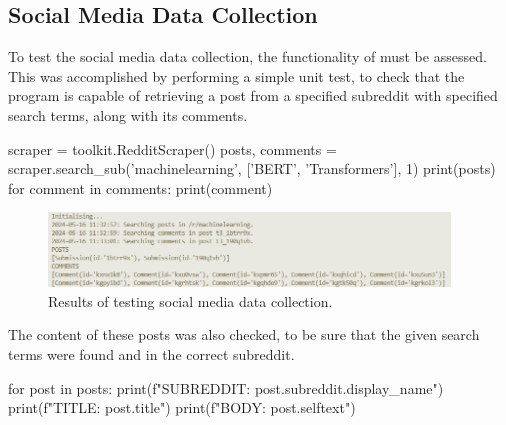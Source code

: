     \subsection{Social Media Data Collection}
    To test the social media data collection, the functionality of  must be assessed. This was accomplished by performing a simple unit test, to check that the program is capable of retrieving a post from a specified subreddit with specified search terms, along with its comments.
    \begin{python}
scraper = toolkit.RedditScraper()
posts, comments = scraper.search_sub('machinelearning', ['BERT', 'Transformers'], 1)
print(posts)
for comment in comments:
    print(comment)
    \end{python}

    \FloatBarrier
    \begin{figure}[h]
        \centering
        \includegraphics[width=0.95\textwidth]{figures/scrape-test.png}
        \caption{Results of testing social media data collection.}
    \end{figure}
    \FloatBarrier

    The content of these posts was also checked, to be sure that the given search terms were found and in the correct subreddit.

    \begin{python}
for post in posts:
    print(f"SUBREDDIT: {post.subreddit.display_name}")
    print(f"TITLE: {post.title}")
    print(f"BODY: {post.selftext}")
    \end{python}

